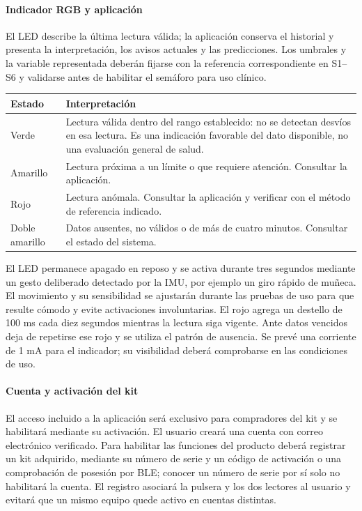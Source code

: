 \paragraph{Indicador RGB y aplicación}
El LED describe la última lectura válida; la aplicación conserva el historial y presenta la interpretación, los avisos actuales y las predicciones. Los umbrales y la variable representada deberán fijarse con la referencia correspondiente en S1--S6 y validarse antes de habilitar el semáforo para uso clínico.
\begin{center}\begin{tabularx}{\linewidth}{lX}\toprule
Estado & Interpretación\\\midrule
Verde & Lectura válida dentro del rango establecido: no se detectan desvíos en esa lectura. Es una indicación favorable del dato disponible, no una evaluación general de salud.\\
Amarillo & Lectura próxima a un límite o que requiere atención. Consultar la aplicación.\\
Rojo & Lectura anómala. Consultar la aplicación y verificar con el método de referencia indicado.\\
Doble amarillo & Datos ausentes, no válidos o de más de cuatro minutos. Consultar el estado del sistema.\\\bottomrule
\end{tabularx}\end{center}
El LED permanece apagado en reposo y se activa durante tres segundos mediante un gesto deliberado detectado por la IMU, por ejemplo un giro rápido de muñeca. El movimiento y su sensibilidad se ajustarán durante las pruebas de uso para que resulte cómodo y evite activaciones involuntarias. El rojo agrega un destello de 100 ms cada diez segundos mientras la lectura siga vigente. Ante datos vencidos deja de repetirse ese rojo y se utiliza el patrón de ausencia. Se prevé una corriente de 1 mA para el indicador; su visibilidad deberá comprobarse en las condiciones de uso.

\paragraph{Cuenta y activación del kit}
El acceso incluido a la aplicación será exclusivo para compradores del kit y se habilitará mediante su activación. El usuario creará una cuenta con correo electrónico verificado. Para habilitar las funciones del producto deberá registrar un kit adquirido, mediante su número de serie y un código de activación o una comprobación de posesión por BLE; conocer un número de serie por sí solo no habilitará la cuenta. El registro asociará la pulsera y los dos lectores al usuario y evitará que un mismo equipo quede activo en cuentas distintas.

